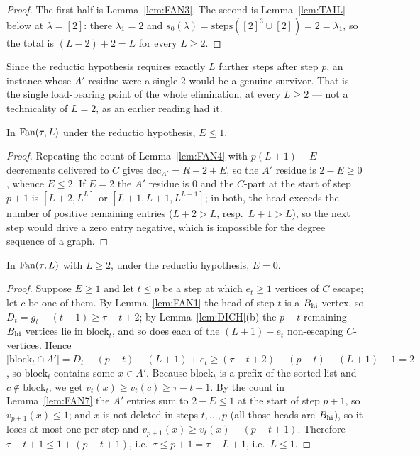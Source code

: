 \begin{proof}
The first half is Lemma~\ref{lem:FAN3}. The second is Lemma~\ref{lem:TAIL} below at
$\lambda = [2]$: there $\lambda_1 = 2$ and $s_0(\lambda) = \mathrm{steps}([2]^3 \cup [2]) =
2 = \lambda_1$, so the total is $(L-2) + 2 = L$ for every $L \ge 2$.
\end{proof}

Since the reductio hypothesis requires exactly $L$ further steps after step $p$, an instance
whose $A'$ residue were a single $2$ would be a genuine survivor. That is the single
load-bearing point of the whole elimination, at every $L \ge 2$ --- not a technicality of
$L = 2$, as an earlier reading had it.

\begin{lemma}\label{lem:FAN7}
In $\mathrm{Fan}(\tau,L)$ under the reductio hypothesis, $E \le 1$.
\end{lemma}

\begin{proof}
Repeating the count of Lemma~\ref{lem:FAN4} with $p(L+1) - E$ decrements delivered to $C$
gives $\mathrm{dec}_{A'} = R - 2 + E$, so the $A'$ residue is $2 - E \ge 0$, whence
$E \le 2$. If $E = 2$ the $A'$ residue is $0$ and the $C$-part at the start of step $p+1$ is
$[L+2, L^L]$ or $[L+1,L+1,L^{L-1}]$; in both, the head exceeds the number of positive
remaining entries ($L+2 > L$, resp.\ $L+1 > L$), so the next step would drive a zero entry
negative, which is impossible for the degree sequence of a graph.
\end{proof}

\begin{lemma}\label{lem:FAN8}
In $\mathrm{Fan}(\tau,L)$ with $L \ge 2$, under the reductio hypothesis, $E = 0$.
\end{lemma}

\begin{proof}
Suppose $E \ge 1$ and let $t \le p$ be a step at which $e_t \ge 1$ vertices of $C$ escape;
let $c$ be one of them. By Lemma~\ref{lem:FAN1} the head of step $t$ is a $B_{\mathrm{hi}}$ vertex, so
$D_t = g_t - (t-1) \ge \tau-t+2$; by Lemma~\ref{lem:DICH}(b) the $p-t$ remaining $B_{\mathrm{hi}}$
vertices lie in $\mathrm{block}_t$, and so does each of the $(L+1)-e_t$ non-escaping
$C$-vertices. Hence
$|\mathrm{block}_t \cap A'| = D_t - (p-t) - (L+1) + e_t \ge (\tau-t+2) - (p-t) - (L+1) + 1
= 2$, so $\mathrm{block}_t$ contains some $x \in A'$. Because $\mathrm{block}_t$ is a prefix
of the sorted list and $c \notin \mathrm{block}_t$, we get
$v_t(x) \ge v_t(c) \ge \tau-t+1$. By the count in Lemma~\ref{lem:FAN7} the $A'$ entries sum
to $2 - E \le 1$ at the start of step $p+1$, so $v_{p+1}(x) \le 1$; and $x$ is not deleted
in steps $t,\dots,p$ (all those heads are $B_{\mathrm{hi}}$), so it loses at most one per step and
$v_{p+1}(x) \ge v_t(x) - (p-t+1)$. Therefore $\tau-t+1 \le 1 + (p-t+1)$, i.e.\
$\tau \le p+1 = \tau-L+1$, i.e.\ $L \le 1$.
\end{proof}

